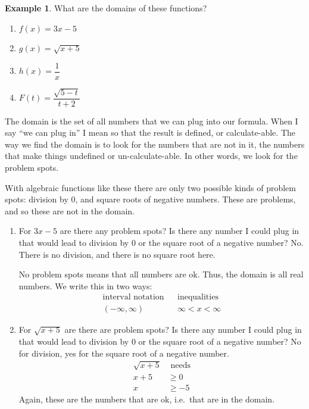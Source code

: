 \documentclass[oneside]{book}
\theoremstyle{definition}
\newtheorem{example}{Example}
\theoremstyle{solution}
\newtheorem*{solution}{Solution}
\newenvironment{solution}{\vspace{2in}\comment}{\endcomment}
\begin{document}
\begin{example}
What are the domains of these functions?
\begin{enumerate}
\item $f(x) = 3x-5$
\item $g(x) = \sqrt{x+5}$
\item $h(x) = \dfrac{1}{x}$
\item $F(t) = \dfrac{\sqrt{5-t}}{t+2}$
\end{enumerate}
\end{example}

\begin{solution}
  The domain is the set of all numbers that we can plug into our
  formula.  When I say ``we can plug in'' I mean so that the result is
  defined, or calculate-able.  The way we find the domain is to look
  for the numbers that are not in it, the numbers that make things
  undefined or un-calculate-able.  In other words, we look for the
  problem spots.

  With algebraic functions like these there are only two possible
  kinds of problem spots: division by 0, and square roots of negative
  numbers.  These are problems, and so these are not in the domain.

\begin{enumerate}
\item For $3x-5$ are there any problem spots?  Is there any number I
  could plug in that would lead to division by $0$ or the square root
  of a negative number?  No.  There is no division, and there is no
  square root here.

  No problem spots means that all numbers are ok.  Thus, the domain is
  all real numbers.  We write this in two ways:
$$
\begin{array}{ccc}
\text{interval notation} & & \text{inequalities}\\
(-\infty,\infty)  && \infty < x < \infty
\end{array}
$$


\item For $\sqrt{x+5}$ are there are problem spots?  Is there any
  number I could plug in that would lead to division by $0$ or the
  square root of a negative number?  No for division, yes for the
  square root of a negative number.
\begin{align*}
\sqrt{x+5} & \text{ needs}\\
x+5 & \ge 0\\
x & \ge -5
\end{align*}
Again, these are the numbers that are ok, i.e.\ that are in the
domain.


\end{enumerate}
\end{solution}
\end{document}
